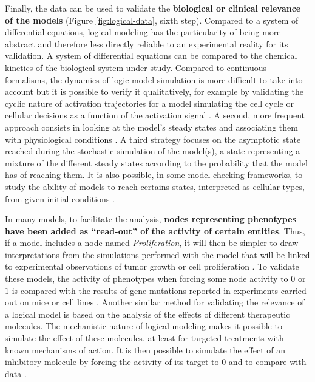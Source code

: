 \documentclass[a4paper,12pt,twoside,onecolumn,openright,final,oldfontcommands]{memoir}
\begin{document}
Finally, the data can be used to validate the \textbf{biological or
clinical relevance of the models} (Figure \ref{fig:logical-data}, sixth
step). Compared to a system of differential equations, logical modeling
has the particularity of being more abstract and therefore less directly
reliable to an experimental reality for its validation. A system of
differential equations can be compared to the chemical kinetics of the
biological system under study. Compared to continuous formalisms, the
dynamics of logic model simulation is more difficult to take into
account but it is possible to verify it qualitatively, for example by
validating the cyclic nature of activation trajectories for a model
simulating the cell cycle \citep{faure2006dynamical} or cellular
decisions as a function of the activation signal
\citep{calzone2010mathematical}. A second, more frequent approach
consists in looking at the model's steady states and associating them
with physiological conditions
\citep{weinstein2017network, cohen2015mathematical}. A third strategy
focuses on the asymptotic state reached during the stochastic simulation
of the model(s), a state representing a mixture of the different steady
states according to the probability that the model has of reaching them.
It is also possible, in some model checking frameworks, to study the
ability of models to reach certains states, interpreted as cellular
types, from given initial conditions \citep{abou2015model}.

In many models, to facilitate the analysis, \textbf{nodes representing
phenotypes have been added as ``read-out'' of the activity of certain
entities}. Thus, if a model includes a node named \emph{Proliferation},
it will then be simpler to draw interpretations from the simulations
performed with the model that will be linked to experimental
observations of tumor growth or cell proliferation
\citep{grieco2013integrative, steinway2015combinatorial}. To validate
these models, the activity of phenotypes when forcing some node activity
to \(0\) or \(1\) is compared with the results of gene mutations
reported in experiments carried out on mice or cell lines
\citep{faure2006dynamical, cohen2015mathematical}. Another similar
method for validating the relevance of a logical model is based on the
analysis of the effects of different therapeutic molecules. The
mechanistic nature of logical modeling makes it possible to simulate the
effect of these molecules, at least for targeted treatments with known
mechanisms of action. It is then possible to simulate the effect of an
inhibitory molecule by forcing the activity of its target to 0 and to
compare with data
\citep{zanudo2017network, iorio2016landscape, knijnenburg2016logic}.
\end{document}

